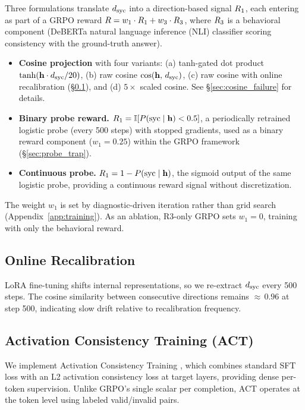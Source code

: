 Three formulations translate $d_{\text{syc}}$ into a direction-based signal $R_1$, each entering as part of a GRPO \citep{shao2024grpo} reward $R = w_1 \cdot R_1 + w_3 \cdot R_3$, where $R_3$ is a behavioral component (DeBERTa natural language inference (NLI) classifier scoring consistency with the ground-truth answer).
\begin{itemize}
\item[\textbf{F1}] \textbf{Cosine projection} with four variants: (a) tanh-gated dot product $\tanh(\mathbf{h} \cdot d_{\text{syc}} / 20)$, (b) raw cosine $\cos(\mathbf{h},\, d_{\text{syc}})$, (c) raw cosine with online recalibration (\S\ref{ssec:recalib}), and (d) $5{\times}$ scaled cosine. See \S\ref{sec:cosine_failure} for details.
\item[\textbf{F2}] \textbf{Binary probe reward.} $R_1 = \mathbb{I}[P(\text{syc} \mid \mathbf{h}) < 0.5]$, a periodically retrained logistic probe (every 500 steps) with stopped gradients, used as a binary reward component ($w_1{=}0.25$) within the GRPO framework (\S\ref{sec:probe_trap}).
\item[\textbf{F3}] \textbf{Continuous probe.} $R_1 = 1 - P(\text{syc} \mid \mathbf{h})$, the sigmoid output of the same logistic probe, providing a continuous reward signal without discretization.
\end{itemize}
The weight $w_1$ is set by diagnostic-driven iteration rather than grid search (Appendix~\ref{app:training}).
As an ablation, R3-only GRPO sets $w_1{=}0$, training with only the behavioral reward.

\subsection{Online Recalibration}
\label{ssec:recalib}

LoRA fine-tuning shifts internal representations, so we re-extract $d_{\text{syc}}$ every 500 steps.
The cosine similarity between consecutive directions remains ${\approx}\,0.96$ at step 500, indicating slow drift relative to recalibration frequency.

\subsection{Activation Consistency Training (ACT)}
\label{ssec:baselines}

We implement Activation Consistency Training \citep[ACT;][]{consistency2025bctact}, which combines standard SFT loss with an L2 activation consistency loss at target layers, providing dense per-token supervision.
Unlike GRPO's single scalar per completion, ACT operates at the token level using labeled valid/invalid pairs.

